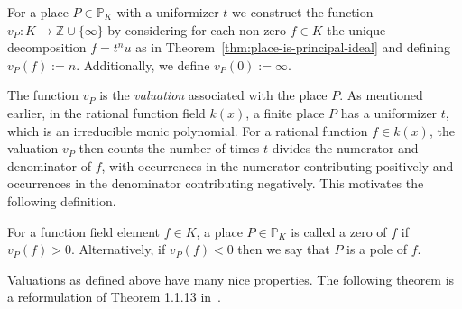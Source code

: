 \begin{definition}%
  \label{def:valuation}
  For a place \(P \in \mathbb{P}_{K}\) with a uniformizer \(t\) we construct the function \(v_{P} : K \to \mathbb{Z} \cup \{\infty\}\) by considering for each non-zero \(f \in K\) the unique decomposition \(f = t^{n}u\) as in Theorem~\ref{thm:place-is-principal-ideal} and defining \(v_{P}(f) := n\). Additionally, we define \({v_{P}(0) := \infty}\).
\end{definition}

The function \(v_{P}\) is the \textit{valuation} associated with the place \(P\). As mentioned earlier, in the rational function field \(k(x)\), a finite place \(P\) has a uniformizer \(t\), which is an irreducible monic polynomial. For a rational function \(f \in k(x)\), the valuation \(v_{P}\) then counts the number of times \(t\) divides the numerator and denominator of \(f\), with occurrences in the numerator contributing positively and occurrences in the denominator contributing negatively. This motivates the following definition.

\begin{definition}%
  \label{def:zero-and-pole}
  For a function field element \(f \in K\), a place \(P \in \mathbb{P}_{K}\) is called a zero of \(f\) if \(v_{P}(f) > 0\). Alternatively, if \(v_{P}(f) < 0\) then we say that \(P\) is a pole of \(f\).
\end{definition}


Valuations as defined above have many nice properties. The following theorem is a reformulation of Theorem 1.1.13 in~\cite{stichtenoth-2009-algebraic-function-fields}.

